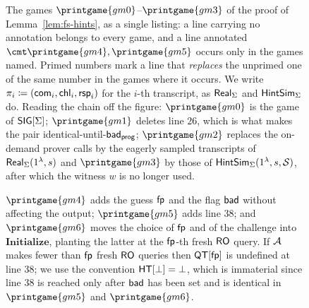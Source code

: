 \begin{figure}[htb]
    \centering
    \renewcommand{\pclnspace}{0.4em}%
    \caption{%
        The games $\printgame{gm0}$--$\printgame{gm3}$ of the proof of
        Lemma~\ref{lem:fs-hints}, as a single listing: a line carrying no
        annotation belongs to every game, and a line annotated
        $\cmt \printgame{gm4}, \printgame{gm5}$ occurs only in the games
        named. Primed numbers mark a line that \emph{replaces} the
        unprimed one of the same number in the games where it occurs. We
        write $\pi_i \coloneqq (\mathsf{com}_i, \mathsf{chl}_i, \mathsf{rsp}_i)$ for the $i$-th
        transcript, as $\mathsf{Real}_\Sigma$ and $\mathsf{HintSim}_\Sigma$ do.
        Reading the chain off the figure: $\printgame{gm0}$ is the \EUFCMA
        game of $\mathsf{SIG}[\Sigma]$; $\printgame{gm1}$ deletes line $26$, which is
        what makes the pair identical-until-$\mathsf{bad}_\mathsf{prog}$; $\printgame{gm2}$
        replaces the on-demand prover calls by the eagerly sampled
        transcripts of $\mathsf{Real}_\Sigma(1^{\lambda}, s)$ and
        $\printgame{gm3}$ by those of
        $\mathsf{HintSim}_\Sigma(1^{\lambda}, s, \mathcal{S})$, after which the witness
        $w$ is no longer used. 
    }\label{fig:games1}
\end{figure}

\begin{figure}[htb]
    \centering
    \renewcommand{\pclnspace}{0.4em}%
    \caption{%
        $\printgame{gm4}$ adds the guess $\mathsf{fp}$
        and the flag $\mathsf{bad}$ without affecting the output;
        $\printgame{gm5}$ adds line $38$; and $\printgame{gm6}$ moves the
        choice of $\mathsf{fp}$ and of the challenge into
        $\mathbf{Initialize}$, planting the latter at the $\mathsf{fp}$-th
        fresh $\mathsf{RO}$ query.
        If $\mathcal{A}$ makes fewer than $\mathsf{fp}$ fresh $\mathsf{RO}$ queries then
        $\mathsf{QT}[\mathsf{fp}]$ is undefined at line $38$; we use the convention
        $\mathsf{HT}[\bot] = \bot$, which is immaterial since line $38$ is reached
        only after $\mathsf{bad}$ has been set and is identical in
        $\printgame{gm5}$ and $\printgame{gm6}$.%
    }\label{fig:games2}
\end{figure}

